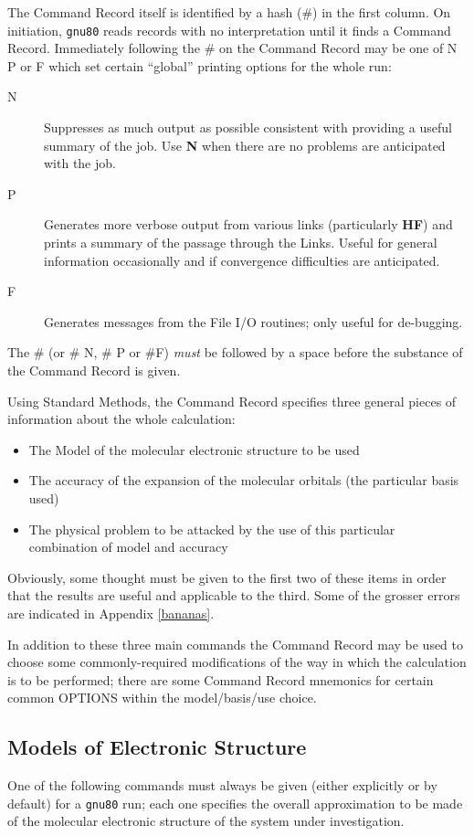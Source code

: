 The Command Record itself is identified by a hash (\#) in the
first column. On initiation, {\tt gnu80} reads records 
with no interpretation until
it finds a Command Record. Immediately following the \# on the
Command Record may be one of N P or F which set certain ``global''
printing options for the whole run:
\begin{description}
\item[N] Suppresses as much output as possible consistent with
providing a useful summary of the job. Use {\bf N} when there are
no problems are anticipated with the job.
\item[P] Generates more verbose output from various links (particularly
{\bf HF}) and prints a summary of the passage through the Links. Useful
for general information occasionally and if convergence difficulties are
anticipated.
\item[F] Generates messages from the File I/O routines; only
useful for de-bugging.
\end{description}
The \# (or \# N, \# P or \#F) {\em must} be followed by a space
before the substance of the Command Record is given.

Using Standard Methods, the Command Record specifies three general
pieces of information about the whole calculation:
\begin{itemize}
\item The Model of the molecular electronic structure to be used
\item The accuracy of the expansion of the molecular orbitals (the
particular basis used)
\item The physical problem to be attacked by the use of this particular
combination of model and accuracy
\end{itemize}
Obviously, some thought must be given to the first two of these
items in order that the results are useful and applicable to the third.
Some of the grosser errors are indicated in Appendix \ref{bananas}.

In addition to these three main commands the Command Record
may be used to choose some commonly-required modifications of
the way in which the calculation is to be performed; there are
some Command Record mnemonics for certain common OPTIONS within the
model/basis/use choice.
\newpage
\subsection{\sf Models of Electronic Structure}
One of the following commands must always be given (either explicitly
or by default) for a {\tt gnu80} run; each one specifies the overall approximation
to be made of the molecular electronic structure of the system under
investigation. 


